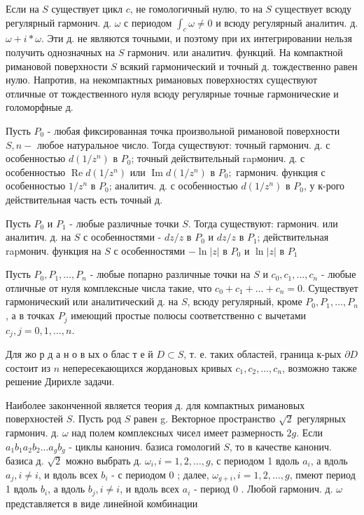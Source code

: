 \documentclass[10pt]{article}
\begin{document}
Если на $S$ существует цикл $c$, не гомологичный нулю, то на $S$ существует всюду регулярный гармонич. д. $\omega$ с периодом $\int_{c} \omega \neq 0$ и всюду регулярный аналитич. д. $\omega+i * \omega$. Эти д. не являются точными, и поэтому при их интегрировании нельзя получить однозначных на $S$ гармонич. или аналитич. функций. На компактной римановой поверхности $S$ всякий гармонический и точный д. тождественно равен нулю. Напротив, на некомпактных римановых поверхностях существуют отличные от тождественного нуля всюду регулярные точные гармонические и голоморфные д.



Пусть $P_{0}$ - любая фиксированная точка произвольной римановой поверхности $S, n-$ любое натуральное число. Тогда существуют: точный гармонич. д. с особенностью $d\left(1 / z^{n}\right)$ в $P_{0}$; точный действительный rapмонич. д. с особенностью $\operatorname{Re} d\left(1 / z^{n}\right)$ или $\operatorname{Im} d\left(1 / z^{n}\right)$ в $P_{0} ;$ гармонич. функция с особенностью $1 / z^{n}$ в $P_{0}$; аналитич. д. с особенностью $d\left(1 / z^{n}\right)$ в $P_{0}$, у к-рого действительная часть есть точный д.



Пусть $P_{0}$ и $P_{1}$ - любые различные точки $S$. Тогда существуют: гармонич. или аналитич. д. на $S$ с особенностями - $d z / z$ в $P_{0}$ и $d z / z$ в $P_{1}$; действительная rapмонич. функция на $S$ с особенностями $-\ln |z|$ в $P_{0}$ и $\ln |z|$ в $P_{1}$



Пусть $P_{0}, P_{1}, \ldots, P_{n}$ - любые попарно различные точки на $S$ и $c_{0}, c_{1}, \ldots, c_{n}$ - любые отличные от нуля комплексные числа такие, что $c_{0}+c_{1}+\ldots+c_{n}=0$. Существует гармонический или аналитический д. на $S$, всюду регулярный, кроме $P_{0}, P_{1}, \ldots, P_{n}$, а в точках $P_{j}$ имеющий простые полюсы соответственно с вычетами $c_{j}, j=0,1, \ldots, n$.



Для жо р д а н о в ых о блас т е й $D \subset S$, т. е. таких областей, граница к-рых $\partial D$ состоит из $n$ непересекающихся жордановых кривых $c_{1}, c_{2}, \ldots, c_{n}$, возможно также решение Дирихле задачи.



Наиболее законченной является теория д. для компактных римановых поверхностей $S$. Пусть род $S$ равен g. Векторное пространство $\sqrt{2}$ регулярных гармонич. д. $\omega$ над полем комплексных чисел имеет размерность $2 g$. Если $a_{1} b_{1} a_{2} b_{2} \ldots a_{g} b_{g}$ - циклы канонич. базиса гомологий $S$, то в качестве канонич. базиса д. $\sqrt{2}$ можно выбрать д. $\omega_{i}, i=1,2, \ldots, g$, с периодом 1 вдоль $a_{i}$, а вдоль $a_{j}, i \neq i$, и вдоль всех $b_{i}$ - с периодом 0 ; далее, $\omega_{g+i}, i=1,2, \ldots, g$, пмеют период 1 вдоль $b_{i}$, а вдоль $b_{j}, i \neq i$, и вдоль всех $a_{i}$ - период 0 . Любой гармонич. д. $\omega$ представляется в виде линейной комбинации
\end{document}
